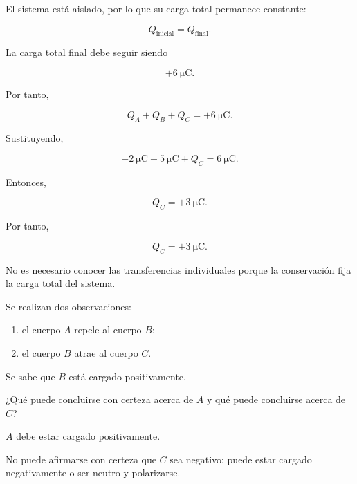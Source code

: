 \begin{explicacion}

El sistema está aislado, por lo que su carga total permanece constante:

\[
Q_{\text{inicial}}
=
Q_{\text{final}}.
\]

La carga total final debe seguir siendo

\[
+\SI{6}{\micro\coulomb}.
\]

Por tanto,

\[
Q_A+Q_B+Q_C
=
+\SI{6}{\micro\coulomb}.
\]

Sustituyendo,

\[
-\SI{2}{\micro\coulomb}
+
\SI{5}{\micro\coulomb}
+
Q_C
=
\SI{6}{\micro\coulomb}.
\]

Entonces,

\[
Q_C
=
+\SI{3}{\micro\coulomb}.
\]

Por tanto,

\[
\boxed{
Q_C=+\SI{3}{\micro\coulomb}
}.
\]

No es necesario conocer las transferencias individuales porque la
conservación fija la carga total del sistema.

\end{explicacion}



\begin{ejercicio}

Se realizan dos observaciones:

\begin{enumerate}
    \item el cuerpo \(A\) repele al cuerpo \(B\);
    \item el cuerpo \(B\) atrae al cuerpo \(C\).
\end{enumerate}

Se sabe que \(B\) está cargado positivamente.

¿Qué puede concluirse con certeza acerca de \(A\) y qué puede concluirse
acerca de \(C\)?

\end{ejercicio}

\begin{respuesta}

\(A\) debe estar cargado positivamente.

No puede afirmarse con certeza que \(C\) sea negativo: puede estar cargado
negativamente o ser neutro y polarizarse.

\end{respuesta}

